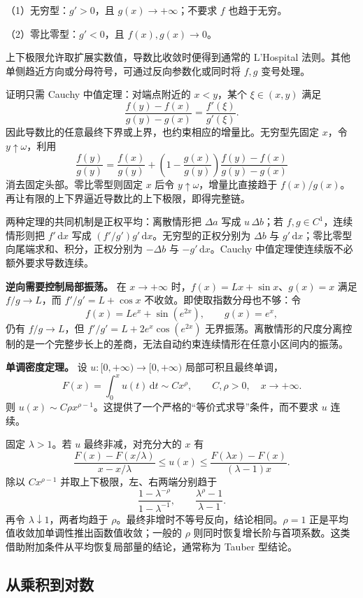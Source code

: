\documentclass[UTF8,12pt,a4paper,fontset=fandol]{ctexart}
\begin{document}
（1）无穷型：$g'>0$，且 $g(x)\to+\infty$；不要求 $f$ 也趋于无穷。

（2）零比零型：$g'<0$，且 $f(x),g(x)\to0$。

上下极限允许取扩展实数值，导数比收敛时便得到通常的 L’Hospital 法则。其他单侧趋近方向或分母符号，可通过反向参数化或同时将 $f,g$ 变号处理。

证明只需 Cauchy 中值定理：对端点附近的 $x<y$，某个 $\xi\in(x,y)$ 满足
\[
\frac{f(y)-f(x)}{g(y)-g(x)}=\frac{f'(\xi)}{g'(\xi)}.
\]
因此导数比的任意最终下界或上界，也约束相应的增量比。无穷型先固定 $x$，令 $y\uparrow\omega$，利用
\[
\frac{f(y)}{g(y)}=
\frac{f(x)}{g(y)}+
\left(1-\frac{g(x)}{g(y)}\right)
\frac{f(y)-f(x)}{g(y)-g(x)}
\]
消去固定头部。零比零型则固定 $x$ 后令 $y\uparrow\omega$，增量比直接趋于 $f(x)/g(x)$。再让有限的上下界逼近导数比的上下极限，即得完整链。

两种定理的共同机制是正权平均：离散情形把 $\Delta a$ 写成 $u\,\Delta b$；若 $f,g\in C^1$，连续情形则把 $f'\,\mathrm dx$ 写成 $(f'/g')g'\,\mathrm dx$。无穷型的正权分别为 $\Delta b$ 与 $g'\,\mathrm dx$；零比零型向尾端求和、积分，正权分别为 $-\Delta b$ 与 $-g'\,\mathrm dx$。Cauchy 中值定理使连续版不必额外要求导数连续。

\textbf{逆向需要控制局部振荡。} 在 $x\to+\infty$ 时，$f(x)=Lx+\sin x$、$g(x)=x$ 满足 $f/g\to L$，而 $f'/g'=L+\cos x$ 不收敛。即使取指数分母也不够：令
\[
f(x)=Le^x+\sin(e^{2x}),\qquad g(x)=e^x,
\]
仍有 $f/g\to L$，但 $f'/g'=L+2e^x\cos(e^{2x})$ 无界振荡。离散情形的尺度分离控制的是一个完整步长上的差商，无法自动约束连续情形在任意小区间内的振荡。

\textbf{单调密度定理。} 设 $u:[0,+\infty)\to[0,+\infty)$ 局部可积且最终单调，
\[
F(x)=\int_0^xu(t)\,\mathrm dt\sim Cx^\rho,
\qquad C,\rho>0,\quad x\to+\infty.
\]
则 $u(x)\sim C\rho x^{\rho-1}$。这提供了一个严格的“等价式求导”条件，而不要求 $u$ 连续。

固定 $\lambda>1$。若 $u$ 最终非减，对充分大的 $x$ 有
\[
\frac{F(x)-F(x/\lambda)}{x-x/\lambda}
\leq u(x)\leq
\frac{F(\lambda x)-F(x)}{(\lambda-1)x}.
\]
除以 $Cx^{\rho-1}$ 并取上下极限，左、右两端分别趋于
\[
\frac{1-\lambda^{-\rho}}{1-\lambda^{-1}},
\qquad
\frac{\lambda^\rho-1}{\lambda-1}.
\]
再令 $\lambda\downarrow1$，两者均趋于 $\rho$。最终非增时不等号反向，结论相同。$\rho=1$ 正是平均值收敛加单调性推出函数值收敛；一般的 $\rho$ 则同时恢复增长阶与首项系数。这类借助附加条件从平均恢复局部量的结论，通常称为 Tauber 型结论。

\subsection{从乘积到对数}
\end{document}
